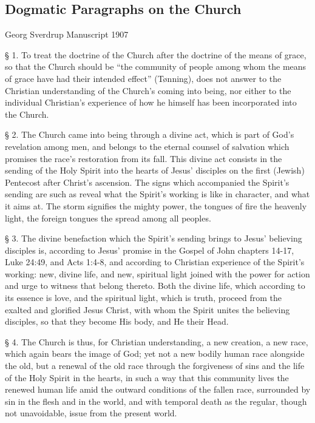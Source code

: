 
\subsection{Dogmatic Paragraphs on the Church}

Georg Sverdrup
Manuscript 1907

§ 1. To treat the doctrine of the Church after the doctrine of the means of grace, so that the Church should be “the community of people among whom the means of grace have had their intended effect” (Tønning), does not answer to the Christian understanding of the Church’s coming into being, nor either to the individual Christian’s experience of how he himself has been incorporated into the Church.

§ 2. The Church came into being through a divine act, which is part of God’s revelation among men, and belongs to the eternal counsel of salvation which promises the race’s restoration from its fall. This divine act consists in the sending of the Holy Spirit into the hearts of Jesus’ disciples on the first (Jewish) Pentecost after Christ’s ascension. The signs which accompanied the Spirit’s sending are such as reveal what the Spirit’s working is like in character, and what it aims at. The storm signifies the mighty power, the tongues of fire the heavenly light, the foreign tongues the spread among all peoples.

§ 3. The divine benefaction which the Spirit’s sending brings to Jesus’ believing disciples is, according to Jesus’ promise in the Gospel of John chapters 14-17, Luke 24:49, and Acts 1:4-8, and according to Christian experience of the Spirit’s working: new, divine life, and new, spiritual light joined with the power for action and urge to witness that belong thereto. Both the divine life, which according to its essence is love, and the spiritual light, which is truth, proceed from the exalted and glorified Jesus Christ, with whom the Spirit unites the believing disciples, so that they become His body, and He their Head.

§ 4. The Church is thus, for Christian understanding, a new creation, a new race, which again bears the image of God; yet not a new bodily human race alongside the old, but a renewal of the old race through the forgiveness of sins and the life of the Holy Spirit in the hearts, in such a way that this community lives the renewed human life amid the outward conditions of the fallen race, surrounded by sin in the flesh and in the world, and with temporal death as the regular, though not unavoidable, issue from the present world.

